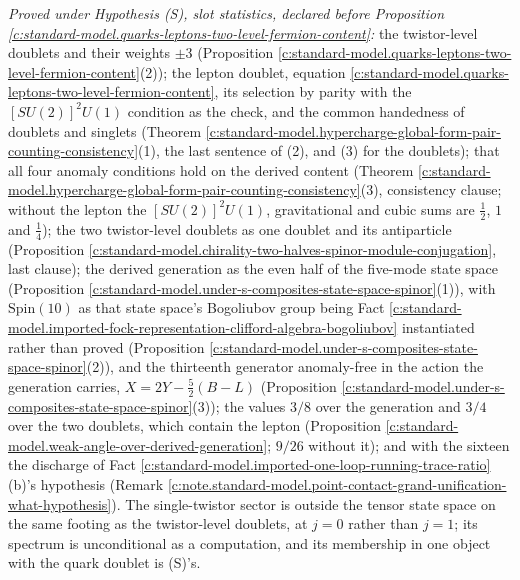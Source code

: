 \documentclass[11pt]{article}
\theoremstyle{definition}
\theoremstyle{plain}
\begin{document}
\emph{Proved under Hypothesis (S), slot statistics, declared before Proposition \ref{c:standard-model.quarks-leptons-two-level-fermion-content}:} the twistor-level doublets and their weights $\pm 3$ (Proposition \ref{c:standard-model.quarks-leptons-two-level-fermion-content}(2)); the lepton doublet, equation \ref{c:standard-model.quarks-leptons-two-level-fermion-content}, its selection by parity with the $[SU(2)]^{2}U(1)$ condition as the check, and the common handedness of doublets and singlets (Theorem \ref{c:standard-model.hypercharge-global-form-pair-counting-consistency}(1), the last sentence of (2), and (3) for the doublets); that all four anomaly conditions hold on the derived content (Theorem \ref{c:standard-model.hypercharge-global-form-pair-counting-consistency}(3), consistency clause; without the lepton the $[SU(2)]^{2}U(1)$, gravitational and cubic sums are $\tfrac12$, $1$ and $\tfrac14$); the two twistor-level doublets as one doublet and its antiparticle (Proposition \ref{c:standard-model.chirality-two-halves-spinor-module-conjugation}, last clause); the derived generation as the even half of the five-mode state space (Proposition \ref{c:standard-model.under-s-composites-state-space-spinor}(1)), with $\mathrm{Spin}(10)$ as that state space's Bogoliubov group being Fact \ref{c:standard-model.imported-fock-representation-clifford-algebra-bogoliubov} instantiated rather than proved (Proposition \ref{c:standard-model.under-s-composites-state-space-spinor}(2)), and the thirteenth generator anomaly-free in the action the generation carries, $X = 2Y - \tfrac52(B - L)$ (Proposition \ref{c:standard-model.under-s-composites-state-space-spinor}(3)); the values $3/8$ over the generation and $3/4$ over the two doublets, which contain the lepton (Proposition \ref{c:standard-model.weak-angle-over-derived-generation}; $9/26$ without it); and with the sixteen the discharge of Fact \ref{c:standard-model.imported-one-loop-running-trace-ratio}(b)'s hypothesis (Remark \ref{c:note.standard-model.point-contact-grand-unification-what-hypothesis}). The single-twistor sector is outside the tensor state space on the same footing as the twistor-level doublets, at $j = 0$ rather than $j = 1$; its spectrum is unconditional as a computation, and its membership in one object with the quark doublet is (S)'s.
\end{document}
